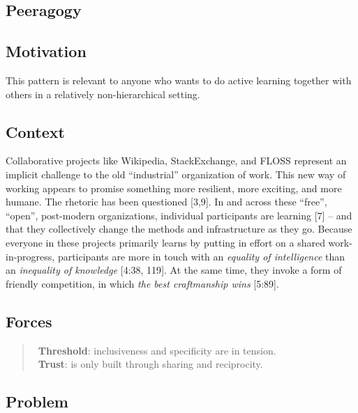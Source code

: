 \hypertarget{peeragogy}{%
\subsection{Peeragogy}\label{peeragogy}}

\hypertarget{motivation}{%
\subsection{Motivation}\label{motivation}}

This pattern is relevant to anyone who wants to do active learning
together with others in a relatively non-hierarchical setting.

\hypertarget{context}{%
\subsection{Context}\label{context}}

Collaborative projects like Wikipedia, StackExchange, and FLOSS
represent an implicit challenge to the old ``industrial'' organization
of work. This new way of working appears to promise something more
resilient, more exciting, and more humane. The rhetoric has been
questioned {{[}3,9{]}}. In and across these ``free'', ``open'',
post-modern organizations, individual participants are learning
{{[}7{]}} -- and that they collectively change the methods and
infrastructure as they go. Because everyone in these projects primarily
learns by putting in effort on a shared work-in-progress, participants
are more in touch with an \emph{equality of intelligence} than an
\emph{inequality of knowledge} {{[}4:38, 119{]}}. At the same time, they
invoke a form of friendly competition, in which \emph{the best
craftmanship wins} {{[}5:89{]}}.

\hypertarget{forces}{%
\subsection{Forces}\label{forces}}

\begin{quote}
\Sthreshold\ \textbf{Threshold}: inclusiveness
and specificity are in tension.\\
\Strust\ \textbf{Trust}: is only built through
sharing and reciprocity.
\end{quote}

\hypertarget{problem}{%
\subsection{Problem}\label{problem}}

